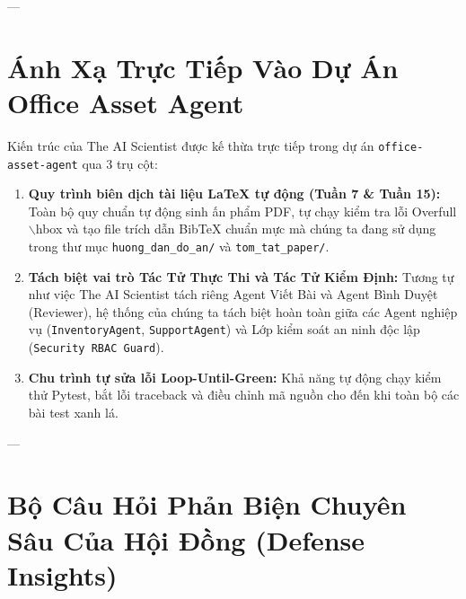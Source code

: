 \documentclass[11pt,a4paper]{article}
\begin{document}
---

\section{Ánh Xạ Trực Tiếp Vào Dự Án Office Asset Agent}

Kiến trúc của The AI Scientist được kế thừa trực tiếp trong dự án \texttt{office-asset-agent} qua 3 trụ cột:

\begin{enumerate}[leftmargin=1.8em]
    \item \textbf{Quy trình biên dịch tài liệu LaTeX tự động (Tuần 7 \& Tuần 15):} Toàn bộ quy chuẩn tự động sinh ấn phẩm PDF, tự chạy kiểm tra lỗi Overfull $\backslash$hbox và tạo file trích dẫn BibTeX chuẩn mực mà chúng ta đang sử dụng trong thư mục \texttt{huong\_dan\_do\_an/} và \texttt{tom\_tat\_paper/}.
    \item \textbf{Tách biệt vai trò Tác Tử Thực Thi và Tác Tử Kiểm Định:} Tương tự như việc The AI Scientist tách riêng Agent Viết Bài và Agent Bình Duyệt (Reviewer), hệ thống của chúng ta tách biệt hoàn toàn giữa các Agent nghiệp vụ (\texttt{InventoryAgent}, \texttt{SupportAgent}) và Lớp kiểm soát an ninh độc lập (\texttt{Security RBAC Guard}).
    \item \textbf{Chu trình tự sửa lỗi Loop-Until-Green:} Khả năng tự động chạy kiểm thử Pytest, bắt lỗi traceback và điều chỉnh mã nguồn cho đến khi toàn bộ các bài test xanh lá.
\end{enumerate}

---

\section{Bộ Câu Hỏi Phản Biện Chuyên Sâu Của Hội Đồng (Defense Insights)}
\end{document}
